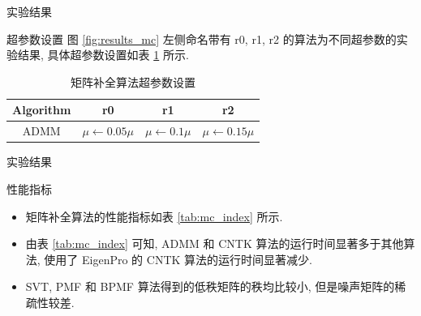 \documentclass{beamer}
\begin{document}
\begin{frame}{实验结果}
  \begin{block}{超参数设置}
    图 \ref{fig:results_mc} 左侧命名带有 \textsf{r0}, \textsf{r1}, \textsf{r2} 的算法为不同超参数的实验结果, 具体超参数设置如表 \ref{tab:mc_hyperparams} 所示.
  \end{block}
  \begin{table}[H]
    \centering
    \small
    \caption{矩阵补全算法超参数设置}
    \label{tab:mc_hyperparams}
    \begin{tabular}{cccc}
      \toprule
      Algorithm  & \textsf{r0}  & \textsf{r1} & \textsf{r2}  \\
      \midrule
      ADMM & $\mu\leftarrow0.05\mu$ & $\mu\leftarrow0.1\mu$ & $\mu\leftarrow0.15\mu$ \\
      \bottomrule
    \end{tabular}
  \end{table}
\end{frame}

\begin{frame}{实验结果}
  \begin{block}{性能指标}
    \begin{itemize}
      \item 矩阵补全算法的性能指标如表 \ref{tab:mc_index} 所示.
      \item 由表 \ref{tab:mc_index} 可知, ADMM 和 CNTK 算法的运行时间显著多于其他算法, 使用了 EigenPro 的 CNTK 算法的运行时间显著减少.
      \item SVT, PMF 和 BPMF 算法得到的低秩矩阵的秩均比较小, 但是噪声矩阵的稀疏性较差.
    \end{itemize}
  \end{block}
\end{frame}
\end{document}

